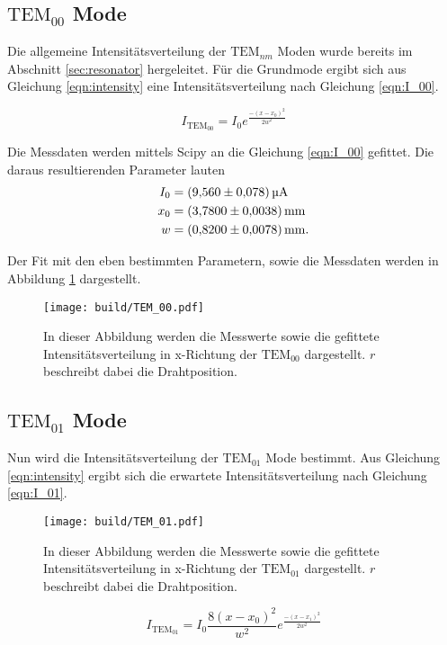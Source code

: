 \subsection{$\text{TEM}_{00}$ Mode}
\label{subsec:TEM00}
Die allgemeine Intensitätsverteilung der $\text{TEM}_{nm}$ Moden wurde bereits im Abschnitt \ref{sec:resonator} hergeleitet. Für die Grundmode ergibt sich aus Gleichung \ref{eqn:intensity} eine 
Intensitätsverteilung nach Gleichung \ref{eqn:I_00}.

\begin{equation}
    \label{eqn:I_00}
    I_{\text{TEM}_{00}} = I_0e^{\frac{-(x-x_0)^2}{2w^2}} 
\end{equation}

Die Messdaten werden mittels Scipy \cite{scipy} an die Gleichung \ref{eqn:I_00} gefittet. Die daraus resultierenden Parameter lauten
\begin{align*}
    I_0 &= \qty{9.56 +- 0.078}{\micro\ampere}\\
    x_0 &= \qty{3.78 +- 0.0038}{\milli\metre}\\
    w   &=  \qty{0.82 +- 0.0078}{\milli\metre}.\\
\end{align*}

Der Fit mit den eben bestimmten Parametern, sowie die Messdaten werden in Abbildung \ref{fig:TEM00} dargestellt.

\begin{figure}
    \centering
    \texttt{[image: build/TEM\_00.pdf]}
    \caption{In dieser Abbildung werden die Messwerte sowie die gefittete Intensitätsverteilung in x-Richtung der $\text{TEM}_{00}$ dargestellt. $r$ beschreibt dabei die Drahtposition.}
    \label{fig:TEM00}
\end{figure}

\subsection{$\text{TEM}_{01}$ Mode}
\label{subsec:TEM01}
Nun wird die Intensitätsverteilung der $\text{TEM}_{01}$ Mode bestimmt. Aus Gleichung \ref{eqn:intensity} ergibt sich die erwartete Intensitätsverteilung nach Gleichung \ref{eqn:I_01}.
\begin{figure}
    \centering
    \texttt{[image: build/TEM\_01.pdf]}
    \caption{In dieser Abbildung werden die Messwerte sowie die gefittete Intensitätsverteilung in x-Richtung der $\text{TEM}_{01}$ dargestellt. $r$ beschreibt dabei die Drahtposition.}
    \label{fig:TEM01}
\end{figure}
\begin{equation}
    \label{eqn:I_01}
    I_{\text{TEM}_{01}} = I_0\frac{8(x-x_0)^2}{w^2}e^{\frac{-(x-x_1)^2}{2w^2}} 
\end{equation}

